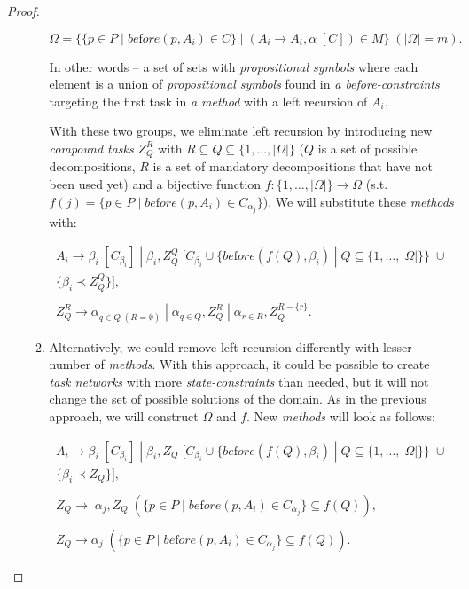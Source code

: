 \begin{proof}
\begin{enumerate}
\begin{enumerate}
            \[
                \Omega = \{\{ p \in P \; | \; be\text{f}ore(p, A_i) \in C\} \; | \; (A_i \rightarrow A_i, \alpha \; [C]) \in M \} \; (|\Omega| = m).
            \]
            
            In other words – a set of sets with \emph{propositional symbols} where each element is a union of \emph{propositional symbols} found in \emph{a before-constraints} targeting the first task in \emph{a method} with a left recursion of $A_i$.
    
            With these two groups, we eliminate left recursion by introducing new \emph{compound tasks} $Z_Q^R$ with $R \subseteq Q \subseteq \{1, \dots, |\Omega|\}$ ($Q$ is a set of possible decompositions, $R$ is a set of mandatory decompositions that have not been used yet) and a bijective function $f: \{1, \dots, |\Omega|\} \rightarrow \Omega$ (s.t. $f(j) = \{p \in P \; | \; be\text{f}ore(p, A_i) \in C_{\alpha_j}\}$). We will substitute these \emph{methods} with:
    
            \begin{gather*}
                A_i \rightarrow \beta_i \; [C_{\beta_i}] \; | \; \beta_i, Z_Q^Q \; [C_{\beta_i} \cup \{be\text{f}ore(f(Q), \beta_i) \; | \; Q \subseteq \{1, \dots, |\Omega|\}\} \; \cup \\ \{\beta_i \prec Z_Q^Q\}], \\ \\
                Z_Q^R \rightarrow \alpha_{q \in Q \; (R = \emptyset)} \; | \; \alpha_{q \in Q}, Z_Q^R \; | \; \alpha_{r \in R}, Z_Q^{R - \{r\}}.
            \end{gather*}
            
            \item Alternatively, we could remove left recursion differently with lesser number of \emph{methods}. With this approach, it could be possible to create \emph{task networks} with more \emph{state-constraints} than needed, but it will not change the set of possible solutions of the domain. As in the previous approach, we will construct $\Omega$ and $f$. New \emph{methods} will look as follows:

            \begin{gather*}
                A_i \rightarrow \beta_i \; [C_{\beta_i}] \; | \; \beta_i, Z_Q \; [C_{\beta_i} \cup \{be\text{f}ore(f(Q), \beta_i) \; | \; Q \subseteq \{1, \dots, |\Omega|\}\} \; \cup \\ \{\beta_i \prec Z_Q\}], \\ \\
                Z_Q \rightarrow \; \alpha_j, Z_Q \; (\{p \in P \; | \; be\text{f}ore(p,A_i) \in C_{\alpha_j}\} \subseteq f(Q)), \\ \\
                Z_Q \rightarrow \alpha_j \; (\{p \in P \; | \; be\text{f}ore(p,A_i) \in C_{\alpha_j}\} \subseteq f(Q)).
            \end{gather*}
        \end{enumerate}
    \end{enumerate}
    

\end{proof}
